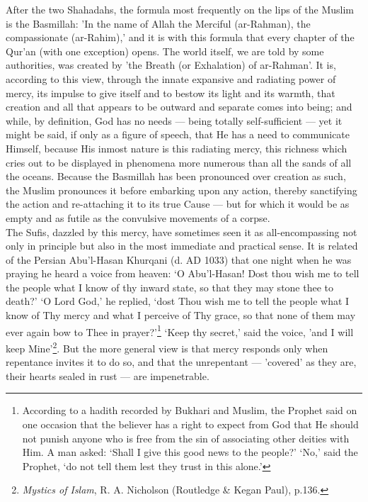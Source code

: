 \documentclass[10pt, twoside]{book}
\begin{document}
After the two Shahadahs, the formula most frequently on the lips of the Muslim is the Basmillah: 'In 
the name of Allah the Merciful (ar\hyp{}Rahman), the compassionate (ar\hyp{}Rahim),' and it is with this 
formula that every chapter of the Qur'an (with one exception) opens. The world itself, we are told by 
some authorities, was created by 'the Breath (or Exhalation) of ar\hyp{}Rahman'. It is, according to this 
view, through the innate expansive and radiating power of mercy, its impulse to give itself and to 
bestow its light and its warmth, that creation and all that appears to be outward and separate comes 
into being; and while, by definition, God has no needs --- being totally self-sufficient --- yet it might 
be said, if only as a figure of speech, that He has a need to communicate Himself, because His inmost 
nature is this radiating mercy, this richness which cries out to be displayed in phenomena more 
numerous than all the sands of all the oceans. Because the Basmillah has been pronounced over 
creation as such, the Muslim pronounces it before embarking upon any action, thereby sanctifying the 
action and re-attaching it to its true Cause --- but for which it would be as empty and as futile as 
the convulsive movements of a corpse. \\

The Sufis, dazzled by this mercy, have sometimes seen it as all\hyp{}encompassing not only in principle 
but also in the most immediate and practical sense. It is related of the Persian Abu'l\hyp{}Hasan Khurqani 
(d. AD 1033) that one night when he was praying he heard a voice from heaven: `O Abu'l\hyp{}Hasan! Dost 
thou wish me to tell the people what I know of thy inward state, so that they may stone thee to 
death?' `O Lord God,' he replied, `dost Thou wish me to tell the people what I know of Thy mercy and 
what I perceive of Thy grace, so that none of them may ever again bow to Thee in prayer?'\footnote{According to a hadith recorded by Bukhari and Muslim, the Prophet said on one occasion that the believer has a right to expect from God that He should not punish anyone who is free from the sin of associating other deities with Him. A man asked: `Shall I give this good news to the people?' `No,' 
said the Prophet, `do not tell them lest they trust in this alone.'} `Keep thy secret,' said the voice, 'and I will keep Mine'\footnote{\emph{Mystics of Islam}, R. A. Nicholson (Routledge \& Kegan Paul), p.136.}. But the more general view is that mercy responds only when repentance invites it to do so, and that the unrepentant --- 'covered' as they are, their hearts sealed in rust --- are impenetrable. \\
\end{document}
